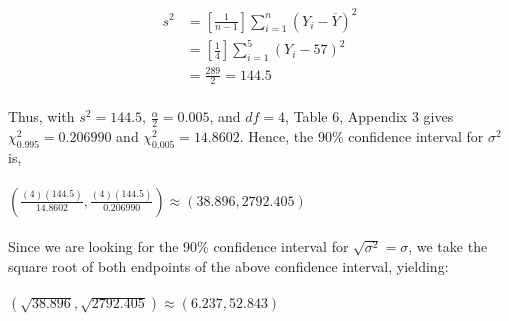 \documentclass[12pt]{article}
\newenvironment{problem}[2][Problem]{\begin{trivlist}
\item[\hskip \labelsep {\bfseries #1}\hskip \labelsep {\bfseries #2.}]}{\end{trivlist}}
\begin{document}
\begin{problem}{8.102}

\end{problem}
\begin{align*}
		 s^2 &= [\frac{1}{n-1}]\sum\limits_{i=1}^{n} (Y_i - \overline{Y})^2\\
		 &= [\frac{1}{4}]\sum\limits_{i=1}^{5} (Y_i - 57)^2\\
		 &= \frac{289}{2} = 144.5
\end{align*}\\

Thus, with $s^2 = 144.5$, $\frac{\alpha}{2} = 0.005$, and $df = 4$, Table 6, Appendix 3 gives $\chi^2_{0.995} = 0.206990$ and $\chi^2_{0.005} = 14.8602$. Hence, the 90\% confidence interval for $\sigma^2$ is,\\
\\
$(\frac{(4)(144.5)}{14.8602}, \frac{(4)(144.5)}{0.206990}) \approx (38.896, 2792.405)$\\
\\
Since we are looking for the 90\% confidence interval for $\sqrt{\sigma^2} = \sigma$, we take the square root of both endpoints of the above confidence interval, yielding:\\
\\
$(\sqrt{38.896}, \sqrt{2792.405}) \approx (6.237, 52.843)$
\end{document}
